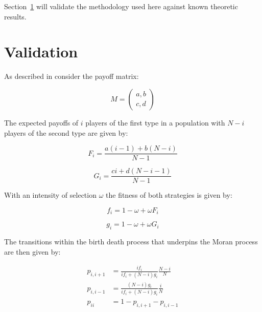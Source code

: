 \documentclass{article}
\begin{document}
Section~\ref{sec:validation} will validate the methodology used here against
known theoretic results.

\section{Validation}\label{sec:validation}

As described in \cite{Nowak} consider the payoff matrix:

\begin{equation}\label{equ:payoff_matrix}
    M = \begin{pmatrix}
        a, b\\
        c, d
        \end{pmatrix}
\end{equation}

The expected payoffs of \(i\) players of the first type in a population with \(N
- i\) players of the second type are given by:

\begin{equation}\label{equ:expected_payoff_one}
    F_i = \frac{a(i - 1) + b(N - i)}{N - 1}
\end{equation}

\begin{equation}\label{equ:expected_payoff_two}
    G_i = \frac{ci + d(N - i - 1)}{N - 1}
\end{equation}

With an intensity of selection \(\omega\) the fitness of both strategies is
given by:

\begin{equation}\label{equ:expected_payoff_one}
    f_i = 1 - \omega + \omega F_i
\end{equation}

\begin{equation}\label{equ:expected_payoff_two}
    g_i = 1 - \omega + \omega G_i
\end{equation}

The transitions within the birth death process that underpins the Moran process
are then given by:

\begin{align}
	p_{i, i+1}&= \frac{if_i}{if_i+(N-i)g_i}\frac{N-i}{N}\label{equ:p_up}\\
	p_{i, i-1}&= \frac{(N-i)g_i}{if_i+(N-i)g_i}\frac{i}{N}\label{equ:p_down}\\
	p_{ii} &= 1 - p_{i, i+1} - p_{i, i-1}\label{equ:p_stay}
\end{align}
\end{document}
